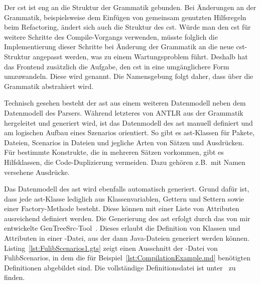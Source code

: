 Der \ac{cst} ist eng an die Struktur der Grammatik gebunden.
Bei Änderungen an der Grammatik, beispielsweise dem Einfügen von gemeinsam genutzten Hilfsregeln beim Refactoring, ändert sich auch die Struktur des \ac{cst}.
Würde man den \ac{cst} für weitere Schritte des Compile-Vorgangs verwenden, müsste folglich die Implementierung dieser Schritte bei Änderung der Grammatik an die neue \ac{cst}-Struktur angepasst werden, was zu einem Wartungsproblem führt.
Deshalb hat das Frontend zusätzlich die Aufgabe, den \ac{cst} in eine umgänglichere Form umzuwandeln.
Diese wird  genannt.
Die Namensgebung folgt daher, dass über die Grammatik abstrahiert wird.

Technisch gesehen besteht der \ac{ast} aus einem weiteren Datenmodell neben dem Datenmodell des Parsers.
Während letzteres von ANTLR aus der Grammatik hergeleitet und generiert wird, ist das Datenmodell des \ac{ast} manuell definiert und am logischen Aufbau eines Szenarios orientiert.
So gibt es \ac{ast}-Klassen für Pakete, Dateien, Scenarios in Dateien und jegliche Arten von Sätzen und Ausdrücken.
Für bestimmte Konstrukte, die in mehreren Sätzen vorkommen, gibt es Hilfsklassen, die Code-Duplizierung vermeiden.
Dazu gehören z.B.\ mit Namen versehene Ausdrücke.

Das Datenmodell des \ac{ast} wird ebenfalls automatisch generiert.
Grund dafür ist, dass jede \ac{ast}-Klasse lediglich aus Klassenvariablen, Gettern und Settern sowie einer Factory-Methode besteht.
Diese können mit einer Liste von Attributen ausreichend definiert werden.
Die Generierung des \ac{ast} erfolgt durch das von mir entwickelte GenTreeSrc-Tool~\cite{gentreesrc}.
Dieses erlaubt die Definition von Klassen und Attributen in einer -Datei, aus der dann Java-Dateien generiert werden können.
Listing~\ref{lst:FulibScenarios1.gts} zeigt einen Ausschnitt der -Datei von FulibScenarios, in dem die für Beispiel~\ref{lst:CompilationExample.md} benötigten Definitionen abgebildet sind.
Die vollständige Definitionsdatei ist unter~\cite{gts-definitions} zu finden.


